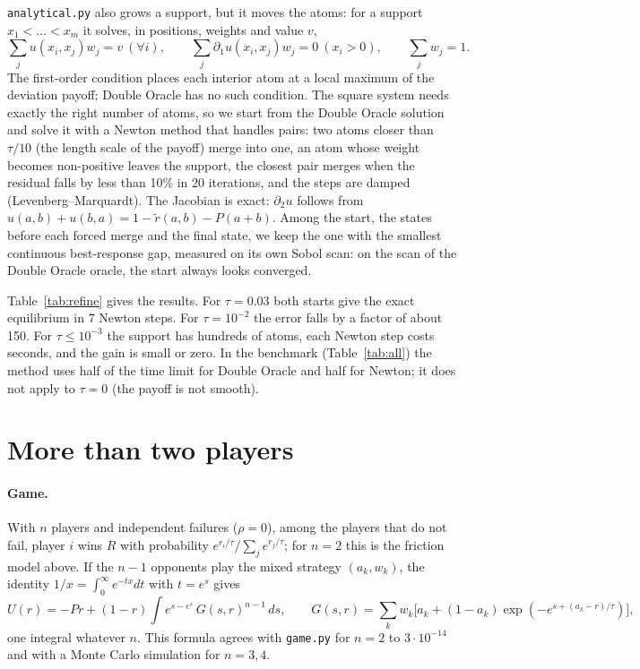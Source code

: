 \documentclass[10pt,a4paper]{article}
\begin{document}
\texttt{analytical.py} also grows a support, but it moves the atoms: for a support
$x_1<\dots<x_m$ it solves, in positions, weights and value $v$,
\[
\textstyle\sum_j u(x_i,x_j)w_j = v\ (\forall i),\qquad
\sum_j \partial_1 u(x_i,x_j)w_j = 0\ (x_i>0),\qquad \sum_j w_j=1 .
\]
The first-order condition places each interior atom at a local maximum of the deviation payoff;
Double Oracle has no such condition. The square system needs exactly the right number of atoms,
so we start from the Double Oracle solution and solve it with a Newton method that handles pairs:
two atoms closer than $\tau/10$ (the length scale of the payoff) merge into one, an atom whose
weight becomes non-positive leaves the support, the closest pair merges when the residual falls
by less than 10\% in 20 iterations, and the steps are damped (Levenberg--Marquardt). The Jacobian is
exact: $\partial_2 u$ follows from $u(a,b)+u(b,a)=1-\tilde r(a,b)-P(a+b)$. Among the start, the
states before each forced merge and the final state, we keep the one with the smallest continuous
best-response gap, measured on its own Sobol scan: on the scan of the Double Oracle oracle, the
start always looks converged.

\begin{table}[H]
\centering\small

\caption{Newton on the atoms after Double Oracle (300\,s) or fictitious play (60\,s), single
thread. Merges: collisions + forced merges.}
\label{tab:refine}
\end{table}

Table~\ref{tab:refine} gives the results. For $\tau=0.03$ both starts give the exact equilibrium
in 7 Newton steps. For $\tau=10^{-2}$ the error falls by a factor of about 150. For $\tau\le10^{-3}$
the support has hundreds of atoms, each Newton step costs seconds, and the gain is small or zero.
In the benchmark (Table~\ref{tab:all}) the method uses half of the time limit for Double Oracle
and half for Newton; it does not apply to $\tau=0$ (the payoff is not smooth).

\section{More than two players}

\paragraph{Game.} With $n$ players and independent failures ($\rho=0$), among the players that do
not fail, player $i$ wins $R$ with probability $e^{r_i/\tau}/\sum_{j} e^{r_j/\tau}$; for $n=2$
this is the friction model above. If the $n-1$ opponents play the mixed strategy $(a_k,w_k)$,
the identity $1/x=\int_0^\infty e^{-tx}dt$ with $t=e^s$ gives
\[
U(r) = -Pr + (1-r)\int e^{s-e^{s}}\,G(s,r)^{n-1}\,ds,\qquad
G(s,r)=\sum_k w_k\big[a_k+(1-a_k)\exp(-e^{s+(a_k-r)/\tau})\big],
\]
one integral whatever $n$. This formula agrees with \texttt{game.py} for $n=2$ to $3\cdot10^{-14}$
and with a Monte Carlo simulation for $n=3,4$.
\end{document}
